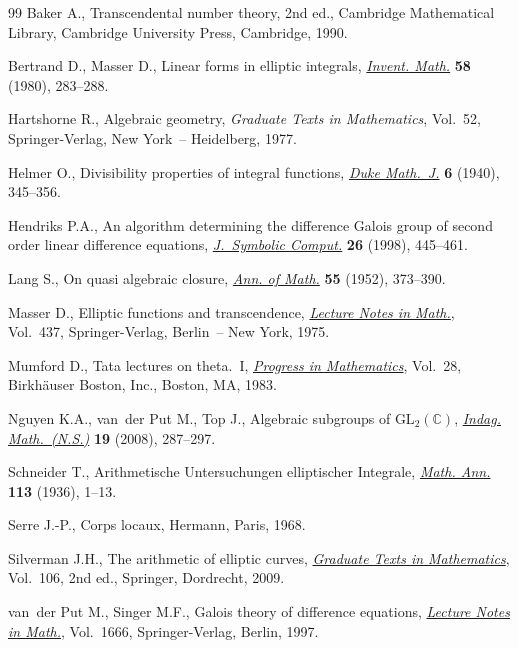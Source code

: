 \documentclass[10pt,a4paper]{amsart}
\numberwithin{equation}{section}
\begin{document}
\begin{thebibliography}{99}
Baker A., Transcendental number theory, 2nd ed., Cambridge Mathematical Library, Cambridge University Press, Cambridge,
1990.

Bertrand D., Masser D., Linear forms in elliptic integrals, \href{http://dx.doi.org/10.1007/BF01390255}{\textit{Invent. Math.}} \textbf{58} (1980), 283--288.

Hartshorne R., Algebraic geometry, \textit{Graduate Texts in Mathematics}, Vol.~52, Springer-Verlag, New York~--
Heidelberg, 1977.

Helmer O., Divisibility properties of integral functions,
\href{http://dx.doi.org/10.1215/S0012-7094-40-00626-3}{\textit{Duke Math.~J.}} \textbf{6} (1940), 345--356.

Hendriks P.A., An algorithm determining the dif\/ference {G}alois group of second order linear dif\/ference equations,
\href{http://dx.doi.org/10.1006/jsco.1998.0223}{\textit{J.~Symbolic Comput.}} \textbf{26} (1998), 445--461.

Lang S., On quasi algebraic closure, \href{http://dx.doi.org/10.2307/1969785}{\textit{Ann. of Math.}} \textbf{55} (1952), 373--390.

Masser D., Elliptic functions and transcendence, \href{http://dx.doi.org/10.1007/BFb0069432}{\textit{Lecture Notes in
Math.}}, Vol.~437, Springer-Verlag, Berlin~-- New York, 1975.

Mumford D., Tata lectures on theta.~{I}, \href{http://dx.doi.org/10.1007/978-1-4899-2843-6}{\textit{Progress in
Mathematics}}, Vol.~28, Birkh\"auser Boston, Inc., Boston, MA, 1983.

Nguyen K.A., van~der Put M., Top J., Algebraic subgroups of {${\text{GL}}_2({\mathbb{C}})$},
\href{http://dx.doi.org/10.1016/S0019-3577(08)80004-3}{\textit{Indag. Math.~(N.S.)}} \textbf{19} (2008), 287--297.

Schneider T., {A}rithmetische {U}ntersuchungen elliptischer {I}ntegrale,
\href{http://dx.doi.org/10.1007/BF01571618}{\textit{Math. Ann.}} \textbf{113} (1936), 1--13.

Serre J.-P., Corps locaux, Hermann, Paris, 1968.

Silverman J.H., The arithmetic of elliptic curves, \href{http://dx.doi.org/10.1007/978-0-387-09494-6}{\textit{Graduate Texts in Mathematics}}, Vol.~106, 2nd ed., Sprin\-ger, Dordrecht, 2009.

van~der Put M., Singer M.F., Galois theory of dif\/ference equations,
\href{http://dx.doi.org/10.1007/BFb0096118}{\textit{Lecture Notes in Math.}}, Vol.~1666, Springer-Verlag, Berlin, 1997.

\end{thebibliography}
\end{document}
